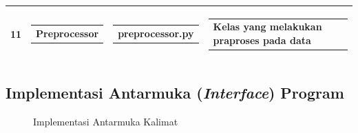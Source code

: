 \begin{longtable}[c]{|l|l|l|l|}
  11                                                             &
  \begin{tabular}[c]{@{}l@{}}Preprocessor\end{tabular}           &
  \begin{tabular}[c]{@{}l@{}}preprocessor.py\end{tabular}        &
  \begin{tabular}[c]{@{}l@{}}Kelas yang melakukan praproses pada data\end{tabular}                                                                                                                                        \\ \hline
\end{longtable}

\subsection{Implementasi Antarmuka (\emph{Interface}) Program}
\begin{figure}[H]
  \centering
  \caption{Implementasi Antarmuka Kalimat}
  \label{fig:interface_kalimat}
\end{figure}

